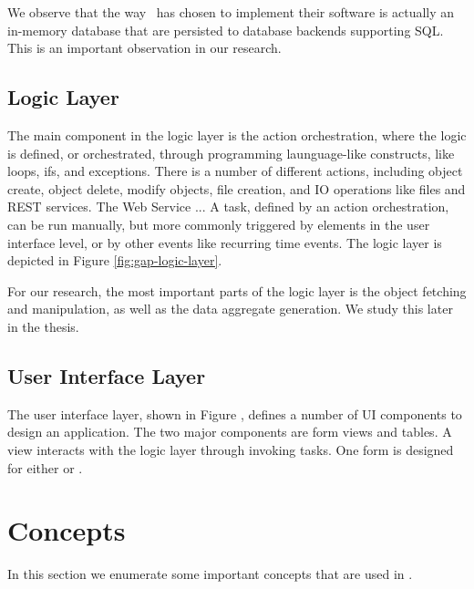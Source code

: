 We observe that the way \genus~has chosen to implement their software is actually an in-memory database that are persisted to database backends supporting SQL. This is an important observation in our research.

\subsection{Logic Layer}
\label{sub:Logic Layer}
The main component in the logic layer is the action orchestration, where the logic is defined, or orchestrated, through programming launguage-like constructs, like loops, ifs,  and exceptions. There is a number of different actions, including object create, object delete, modify objects, file creation, and IO operations like files and REST services. The Web Service ... A task, defined by an action orchestration, can be run manually, but more commonly triggered by elements in the user interface level, or by other events like recurring time events. The logic layer is depicted in Figure \ref{fig:gap-logic-layer}.

For our research, the most important parts of the logic layer is the object fetching and manipulation, as well as the data aggregate generation. We study this later in the thesis.

\subsection{User Interface Layer}
\label{sub:User Interface Layer}
The user interface layer, shown in Figure \cite{fig:gap-user-interface-layer}, defines a number of UI components to design an application. The two major components are form views and tables. A view interacts with the logic layer through invoking tasks. One form is designed for either  or .

\section{Concepts}
\label{sec:Concepts}
In this section we enumerate some important concepts that are used in \gap.

